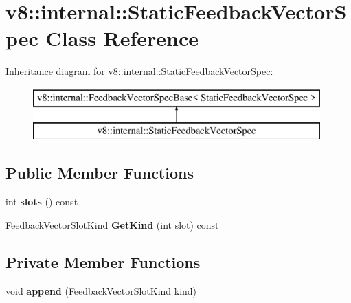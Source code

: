 \hypertarget{classv8_1_1internal_1_1_static_feedback_vector_spec}{}\section{v8\+:\+:internal\+:\+:Static\+Feedback\+Vector\+Spec Class Reference}
\label{classv8_1_1internal_1_1_static_feedback_vector_spec}
Inheritance diagram for v8\+:\+:internal\+:\+:Static\+Feedback\+Vector\+Spec\+:\begin{figure}[H]
\begin{center}
\leavevmode
\includegraphics[height=2.000000cm]{classv8_1_1internal_1_1_static_feedback_vector_spec}
\end{center}
\end{figure}
\subsection*{Public Member Functions}
\begin{DoxyCompactItemize}
\item 
int {\bfseries slots} () const \hypertarget{classv8_1_1internal_1_1_static_feedback_vector_spec_ab5e2b390e1e83df1999358590684fdbb}{}\label{classv8_1_1internal_1_1_static_feedback_vector_spec_ab5e2b390e1e83df1999358590684fdbb}

\item 
Feedback\+Vector\+Slot\+Kind {\bfseries Get\+Kind} (int slot) const \hypertarget{classv8_1_1internal_1_1_static_feedback_vector_spec_ac6bd554f19b757115b843a806dc61966}{}\label{classv8_1_1internal_1_1_static_feedback_vector_spec_ac6bd554f19b757115b843a806dc61966}

\end{DoxyCompactItemize}
\subsection*{Private Member Functions}
\begin{DoxyCompactItemize}
\item 
void {\bfseries append} (Feedback\+Vector\+Slot\+Kind kind)\hypertarget{classv8_1_1internal_1_1_static_feedback_vector_spec_ab6e7e1b8f32a207f0ecf665470e26596}{}\label{classv8_1_1internal_1_1_static_feedback_vector_spec_ab6e7e1b8f32a207f0ecf665470e26596}

\end{DoxyCompactItemize}
